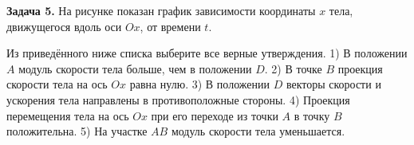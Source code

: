 \begin{taskbasic}[code={\label{task:dem26_v7_n5}}]
\textbf{Задача 5.} На рисунке показан график зависимости координаты $x$ тела, движущегося вдоль оси $Ox$, от времени $t$. 

\nopagebreak\smallskip
\begin{center}
\end{center}

Из приведённого ниже списка выберите все верные утверждения.
1) В положении $A$ модуль скорости тела больше, чем в положении $D$.
2) В точке $B$ проекция скорости тела на ось $Ox$ равна нулю.
3) В положении $D$ векторы скорости и ускорения тела направлены в противоположные стороны.
4) Проекция перемещения тела на ось $Ox$ при его переходе из точки $A$ в точку $B$ положительна.
5) На участке $AB$ модуль скорости тела уменьшается.

\end{taskbasic}



